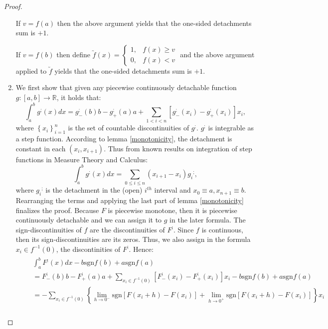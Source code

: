 \documentclass[11pt]{book}
\begin{document}
\begin{proof}
\begin{enumerate}
If $v=f\left(a\right)$ then the above argument yields that the one-sided detachments sum is $+1$.

If $v=f\left(b\right)$ then define $\utilde{f}\left(x\right)=\begin{cases}
1, & f\left(x\right)\geq v\\
0, & f\left(x\right)<v
\end{cases}$ and the above argument applied to $\utilde{f}$ yields that the one-sided detachments sum is $+1$.
\item We first show that given any piecewise continuously detachable function $g:\left[a,b\right]\rightarrow\mathbb{R}$, it holds that: $$\int_{a}^{b}g^{;}(x)dx=g_{-}^{;}\left(b\right)b-g_{+}^{;}\left(a\right)a+\underset{1<i<n}{\sum}\left[g_{-}^{;}\left(x_{i}\right)-g_{+}^{;}\left(x_{i}\right)\right]x_{i},$$ where $\left\{ x_{i}\right\} _{i=1}^{n}$ is the set of countable discontinuities of $g^{;}$. $g^{;}$ is integrable as a step function. According to lemma \ref{monotonicity}, the detachment is constant in each $\left(x_{i},x_{i+1}\right)$. Thus from known results on integration of step functions in Measure Theory and Calculus:$$\int_{a}^{b}g^{;}\left(x\right)dx=\underset{0\leq i\leq n}{\sum}\left(x_{i+1}-x_{i}\right)g_{i}{}^{;},$$
where $g_{i}{}^{;}$ is the detachment in the (open) $i^{th}$ interval and $x_{0}\equiv a,x_{n+1}\equiv b$. Rearranging the terms and applying the last part of lemma \ref{monotonicity} finalizes the proof. Because $F$ is piecewise monotone, then it is piecewise continuously detachable and we can assign it to $g$ in the later formula. The sign-discontinuities of $f$ are the discontinuities of $F^{;}$. Since $f$ is continuous, then its sign-discontinuities are its zeros. Thus, we also assign in the formula $x_{i}\in f^{-1}\left(0\right)$, the discontinities of $F^{;}$. Hence:
\begin{align}
&\begin{aligned}
&\int_{a}^{b}F^{;}\left(x\right)dx-b\text{sgn}f\left(b\right)+a\text{sgn}f\left(a\right)\\
&=F_{-}^{;}\left(b\right)b-F_{+}^{;}\left(a\right)a+\underset{x_{i}\in f^{-1}\left(0\right)}{\sum}\left[F_{-}^{;}\left(x_{i}\right)-F_{+}^{;}\left(x_{i}\right)\right]x_{i}
-b\text{sgn}f\left(b\right)+a\text{sgn}f\left(a\right) \\
&=-\underset{x_{i}\in f^{-1}\left(0\right)}{\sum}\left\{ \underset{h\rightarrow0^{-}}{\lim}\text{sgn}\left[F\left(x_{i}+h\right)-F\left(x_{i}\right)\right]+\underset{h\rightarrow0^{+}}{\lim}\text{sgn}\left[F\left(x_{i}+h\right)-F\left(x_{i}\right)\right]\right\} x_{i}\\

\end{aligned}
\end{align}
\end{enumerate}
\end{proof}
\end{document}
